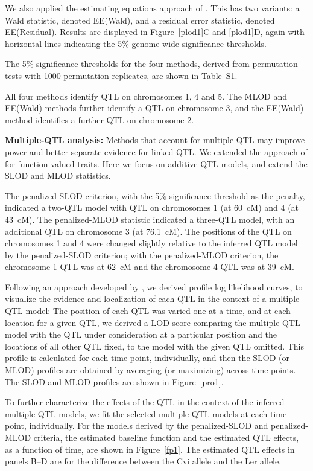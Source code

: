 \documentclass[12pt,letterpaper]{article}
\begin{document}
We also applied the estimating equations approach of
\citet{Xiong2011}. This has two variants: a Wald statistic, denoted
EE(Wald), and a residual error statistic, denoted
EE(Residual). Results are displayed in Figure~\ref{plod1}C and
\ref{plod1}D, again with horizontal lines indicating the 5\%
genome-wide significance thresholds.

The 5\% significance thresholds for the four methods, derived from
permutation tests with 1000 permutation replicates, are shown in
Table~S1.

All four methods identify QTL on chromosomes 1, 4 and 5. The MLOD and
EE(Wald) methods further identify a QTL on chromosome 3, and
the EE(Wald) method identifies a further QTL on chromosome 2.

\textbf{Multiple-QTL analysis:}
Methods that account for multiple QTL may improve power and better separate evidence for
linked QTL. We extended the approach of \citet{Broman2002} for
function-valued traits. Here we focus on additive QTL models, and
extend the SLOD and MLOD statistics.

The penalized-SLOD criterion, with the 5\% significance threshold as
the penalty, indicated a two-QTL model with QTL on chromosomes 1
(at 60~cM) and 4 (at 43~cM).
The penalized-MLOD statistic indicated a
three-QTL model, with an additional QTL on chromosome 3
(at 76.1~cM).
The positions of the QTL on chromosomes 1 and 4 were changed slightly
relative to the inferred QTL model by the penalized-SLOD criterion;
with the penalized-MLOD criterion, the chromosome 1 QTL was at 62~cM
and the chromosome 4 QTL was at 39~cM.


Following an approach developed by \citet{Zeng2000}, we derived
profile log likelihood curves, to visualize the evidence and localization
of each QTL in the context of a multiple-QTL model: The position of each QTL was varied
one at a time, and at each location for a given QTL, we
derived a LOD score comparing the multiple-QTL model
with the QTL under consideration at a particular position and the
locations of all other QTL fixed,
to the model with the given QTL omitted.
This profile is calculated for each time point, individually, and then
the SLOD (or MLOD) profiles are obtained by averaging (or maximizing)
across time points. The SLOD and MLOD profiles are shown in Figure~\ref{pro1}.

To further characterize the effects of the QTL in the context of the
inferred multiple-QTL models, we fit the selected multiple-QTL models
at each time point, individually. For the models derived by the
penalized-SLOD and penalized-MLOD criteria, the estimated baseline
function and the estimated QTL effects, as a function of time, are
shown in Figure~\ref{fp1}. The estimated QTL effects in panels B--D
are for the difference between the Cvi allele and the Ler allele.
\end{document}
